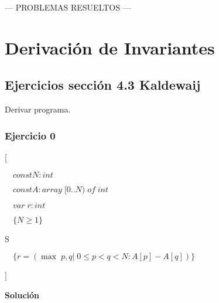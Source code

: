 \documentclass[hidelinks]{article}
\begin{document}
\newpage
\vspace*{\fill}
	\hspace*{\fill} --- PROBLEMAS RESUELTOS --- \hspace*{\fill}
\vspace*{\fill}
\thispagestyle{empty}
\newpage

\section{Derivación de Invariantes}

\subsection{Ejercicios sección 4.3 Kaldewaij} \par

Derivar programa.\par


\subsubsection{Ejercicio 0}
[\par
$\quad const N: int$\par
$\quad const A: array \; [0..N) \; of \; int$\par
$\quad var \; r: int$\par
$\quad \{N \geq 1\}$\par
\hspace{1em} S \par
$\quad \{r =(\max \; p,q| \; 0 \leq p < q < N : A[p] - A[q])\}$ \par
]

\newpage

\textbf{Solución}
\end{document}
